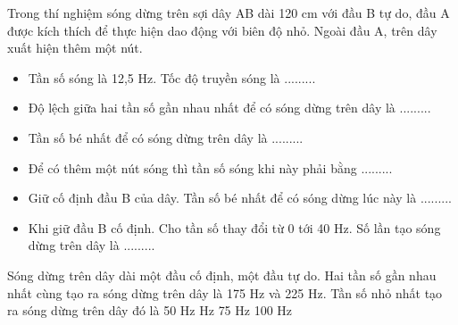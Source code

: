 \begin{vidu}%
Trong thí nghiệm sóng dừng trên sợi dây AB dài 120 cm với đầu B tự do, đầu A được kích thích để thực hiện dao động với biên độ nhỏ. Ngoài đầu A, trên dây xuất hiện thêm một nút. 
\begin{itemize}
\item [1.] Tần số sóng là 12,5 Hz. Tốc độ truyền sóng  là ......... 
\item [2.] Độ lệch giữa hai tần số gần nhau nhất để có sóng dừng trên dây  là ......... 
\item [3.] Tần số bé nhất để có sóng dừng trên dây là ......... 
\item [4.] Để có thêm một nút sóng thì tần số sóng khi này phải bằng  ......... 
\item [5.] Giữ cố định đầu B của dây. Tần số bé nhất để có sóng dừng lúc này là ......... 
\item [6.] Khi giữ đầu B cố định. Cho tần số thay đổi từ 0 tới 40 Hz. Số lần tạo sóng dừng trên dây  là ......... 
\end{itemize}
\end{vidu} %
\begin{vidu}%
Sóng dừng trên dây dài một đầu cố định, một đầu tự do. Hai tần số gần nhau nhất cùng tạo ra sóng dừng trên dây là 175 Hz và 225 Hz. Tần số nhỏ nhất tạo ra sóng dừng trên dây đó là
\choice
{50 Hz}
{ Hz}
{75 Hz}
{100 Hz}
\end{vidu} %
